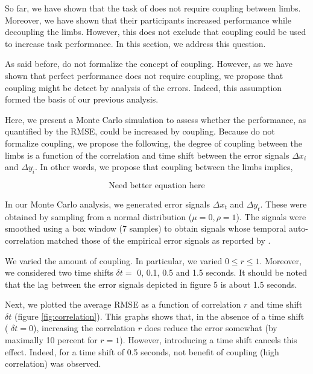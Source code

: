\documentclass[11pt]{article}
\begin{document}
So far, we have shown that the task of \citet{Annand2020} does not require coupling between limbs. Moreover, we have shown that their participants increased performance while decoupling the limbs. However, this does not exclude that coupling could be used to increase task performance. In this section, we address this question.

As said before, \citet{Annand2020} do not formalize the concept of coupling. However, as we have shown that perfect performance does not require coupling, we propose that coupling might be detect by analysis of the errors. Indeed, this assumption formed the basis of our previous analysis.

Here, we present a Monte Carlo simulation to assess whether the performance, as quantified by the RMSE, could be increased by coupling. Because \citet{Annand2020} do not formalize coupling, we propose the following, the degree of coupling between the limbs is a function of the correlation and time shift between the error signals $\Delta x_i$ and $\Delta y_i$. In other words, we propose that coupling between the limbs implies,

\begin{equation}
\mbox{Need better equation here}
\label{eq:coupling}
\end{equation}
%

In our Monte Carlo analysis, we generated error signals $\Delta x_t$ and $\Delta y_t$. These were obtained by sampling from a normal distribution ($\mu = 0, \rho=1$).  The signals were smoothed using a box window (7 samples) to obtain signals whose temporal auto-correlation matched those of the empirical error signals as reported by \citet{Annand2020}.

We varied the amount of coupling. In particular, we varied $0 \leq r \leq 1$. Moreover, we considered two time shifts  $\delta t =$ 0, 0.1, 0.5 and 1.5 seconds. It should be noted that the lag between the error signals depicted in figure 5 is about 1.5 seconds.

Next, we plotted the average RMSE as a function of correlation $r$ and time shift  $\delta t$ (figure \ref{fig:correlation}). This graphs shows that, in the absence of a time shift ( $\delta t = 0$), increasing the correlation $r$ does reduce the error somewhat (by maximally 10 percent for $r=1$). However, introducing a time shift cancels this effect. Indeed, for a time shift of 0.5 seconds, not benefit of coupling (high correlation) was observed.
\end{document}
